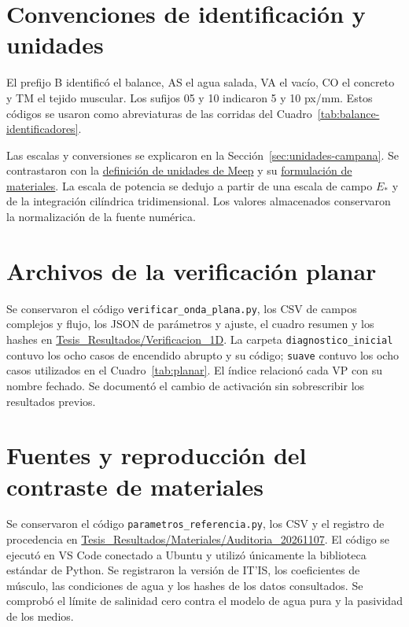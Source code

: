 \section{Convenciones de identificación y unidades}
El prefijo B identificó el balance, AS el agua salada, VA el vacío, CO el concreto y TM el tejido muscular. Los sufijos 05 y 10 indicaron 5 y 10 px/mm. Estos códigos se usaron como abreviaturas de las corridas del Cuadro~\ref{tab:balance-identificadores}.

Las escalas y conversiones se explicaron en la Sección~\ref{sec:unidades-campana}. Se contrastaron con la \href{https://meep.readthedocs.io/en/latest/Introduction/#units-in-meep}{definición de unidades de Meep} y su \href{https://meep.readthedocs.io/en/latest/Materials/}{formulación de materiales}. La escala de potencia se dedujo a partir de una escala de campo $E_*$ y de la integración cilíndrica tridimensional. Los valores almacenados conservaron la normalización de la fuente numérica.


\section{Archivos de la verificación planar}
Se conservaron el código \texttt{verificar\_onda\_plana.py}, los CSV de campos complejos y flujo, los JSON de parámetros y ajuste, el cuadro resumen y los hashes en \href{https://github.com/JavierMencos/Resultados-de-Tesis/tree/main/Tesis_Resultados/Verificacion_1D}{Tesis\_Resultados/Verificacion\_1D}. La carpeta \texttt{diagnostico\_inicial} contuvo los ocho casos de encendido abrupto y su código; \texttt{suave} contuvo los ocho casos utilizados en el Cuadro~\ref{tab:planar}. El índice relacionó cada VP con su nombre fechado. Se documentó el cambio de activación sin sobrescribir los resultados previos.

\section{Fuentes y reproducción del contraste de materiales}\label{an:materiales-fuentes}
Se conservaron el código \texttt{parametros\_referencia.py}, los CSV y el registro de procedencia en \href{https://github.com/JavierMencos/Resultados-de-Tesis/tree/main/Tesis_Resultados/Materiales/Auditoria_20261107}{Tesis\_Resultados/Materiales/Auditoria\_20261107}. El código se ejecutó en VS Code conectado a Ubuntu y utilizó únicamente la biblioteca estándar de Python. Se registraron la versión de IT'IS, los coeficientes de músculo, las condiciones de agua y los hashes de los datos consultados. Se comprobó el límite de salinidad cero contra el modelo de agua pura y la pasividad de los medios.

